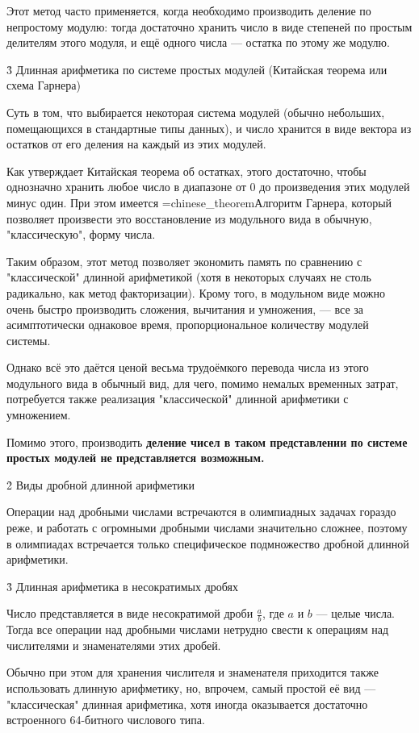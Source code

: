 Этот метод часто применяется, когда необходимо производить деление по непростому модулю: тогда достаточно хранить число в виде степеней по простым делителям этого модуля, и ещё одного числа --- остатка по этому же модулю.


\h3{ Длинная арифметика по системе простых модулей (Китайская теорема или схема Гарнера) }

Суть в том, что выбирается некоторая система модулей (обычно небольших, помещающихся в стандартные типы данных), и число хранится в виде вектора из остатков от его деления на каждый из этих модулей.

Как утверждает Китайская теорема об остатках, этого достаточно, чтобы однозначно хранить любое число в диапазоне от 0 до произведения этих модулей минус один. При этом имеется \algohref=chinese_theorem{Алгоритм Гарнера}, который позволяет произвести это восстановление из модульного вида в обычную, "классическую", форму числа.

Таким образом, этот метод позволяет экономить память по сравнению с "классической" длинной арифметикой (хотя в некоторых случаях не столь радикально, как метод факторизации). Крому того, в модульном виде можно очень быстро производить сложения, вычитания и умножения, --- все за асимптотически однаковое время, пропорциональное количеству модулей системы.

Однако всё это даётся ценой весьма трудоёмкого перевода числа из этого модульного вида в обычный вид, для чего, помимо немалых временных затрат, потребуется также реализация "классической" длинной арифметики с умножением.

Помимо этого, производить \bf{деление} чисел в таком представлении по системе простых модулей не представляется возможным.


\h2{ Виды дробной длинной арифметики }

Операции над дробными числами встречаются в олимпиадных задачах гораздо реже, и работать с огромными дробными числами значительно сложнее, поэтому в олимпиадах встречается только специфическое подмножество дробной длинной арифметики.


\h3{ Длинная арифметика в несократимых дробях }

Число представляется в виде несократимой дроби $\frac{a}{b}$, где $a$ и $b$ --- целые числа. Тогда все операции над дробными числами нетрудно свести к операциям над числителями и знаменателями этих дробей.

Обычно при этом для хранения числителя и знаменателя приходится также использовать длинную арифметику, но, впрочем, самый простой её вид --- "классическая" длинная арифметика, хотя иногда оказывается достаточно встроенного 64-битного числового типа.



